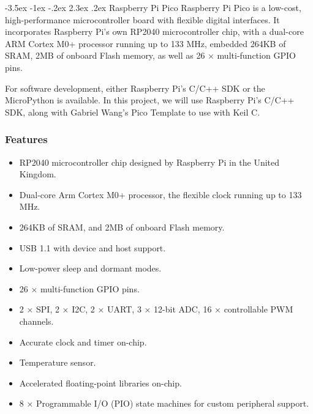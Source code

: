 \documentclass[a4paper,twoside]{report}
\makeatletter
\renewcommand\section{\@startsection {section}{1}{-1em}%
  {-3.5ex \@plus -1ex \@minus -.2ex}%
  {2.3ex \@plus.2ex}%
  {\normalfont\Large\bfseries}}
\makeatother
\begin{document}
\section{Raspberry Pi Pico}
Raspberry Pi Pico is a low-cost, high-performance microcontroller board with flexible digital interfaces. It incorporates Raspberry Pi's own RP2040 microcontroller chip, with a dual-core ARM Cortex M0+ processor running up to 133 MHz, embedded 264KB of SRAM, 2MB of onboard Flash memory, as well as 26 × multi-function GPIO pins.

For software development, either Raspberry Pi's C/C++ SDK or the MicroPython is available. In this project, we will use Raspberry Pi's C/C++ SDK, along with Gabriel Wang's Pico Template to use with Keil C.

\subsubsection{Features}
\begin{itemize}
\item RP2040 microcontroller chip designed by Raspberry Pi in the United Kingdom.
\item Dual-core Arm Cortex M0+ processor, the flexible clock running up to 133 MHz.
\item 264KB of SRAM, and 2MB of onboard Flash memory.
\item USB 1.1 with device and host support.
\item Low-power sleep and dormant modes.
\item 26 × multi-function GPIO pins.
\item 2 × SPI, 2 × I2C, 2 × UART, 3 × 12-bit ADC, 16 × controllable PWM channels.
\item Accurate clock and timer on-chip.
\item Temperature sensor.
\item Accelerated floating-point libraries on-chip.
\item 8 × Programmable I/O (PIO) state machines for custom peripheral support.
\end{itemize}
\end{document}

